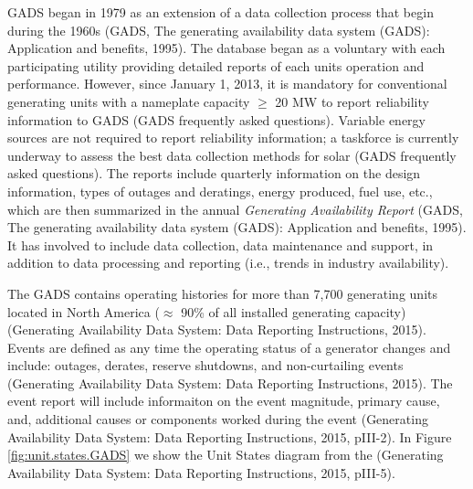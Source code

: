 \documentclass[10pt]{amsart}
\begin{document}
	GADS began in 1979 as an extension of a data collection process that begin during the 1960s \parencite{}(GADS, The generating availability data system (GADS): Application and benefits, 1995).
	The database began as a voluntary with each participating utility providing detailed reports of each units operation and performance.
	However, since January 1, 2013, it is mandatory for conventional generating units with a nameplate capacity $\geq$ 20 MW to report reliability information to GADS \parencite{}(GADS frequently asked questions).  
	Variable energy sources are not required to report reliability information; a taskforce is currently underway to assess the best data collection methods for solar \parencite{}(GADS frequently asked questions). 
	The reports include quarterly information on the design information, types of outages and deratings, energy produced, fuel use, etc., which are then summarized in the annual \textit{Generating Availability Report} \parencite{} (GADS, The generating availability data system (GADS): Application and benefits, 1995).   
	It has involved to include data collection, data maintenance and support, in addition to data processing and reporting (i.e., trends in industry availability).
	
	The GADS contains operating histories for more than 7,700 generating units located in North America ($\approx$ 90\% of all installed generating capacity)\parencite{}(Generating Availability Data System: Data Reporting Instructions, 2015). 
	Events are defined as any time the operating status of a generator changes and include: outages, derates, reserve shutdowns, and non-curtailing events \parencite{}(Generating Availability Data System: Data Reporting Instructions, 2015).
	The event report will include informaiton on the event magnitude, primary cause, and, additional causes or components worked during the event \parencite{}(Generating Availability Data System: Data Reporting Instructions, 2015, pIII-2).
	In Figure \ref{fig:unit.states.GADS} we show the Unit States diagram from the \parencite{}(Generating Availability Data System: Data Reporting Instructions, 2015, pIII-5).
	
\end{document}
